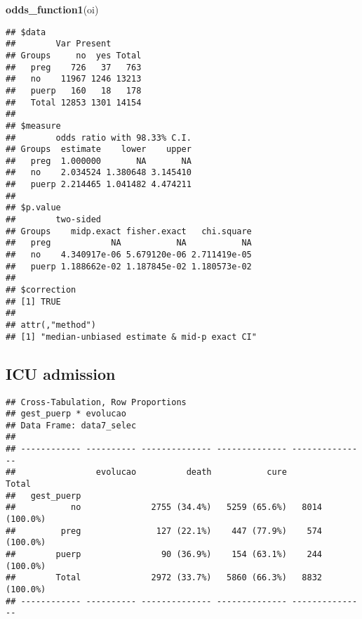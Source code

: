 \documentclass[
]{article}
\newenvironment{Shaded}{\begin{snugshade}}{\end{snugshade}}
\newcommand{\DataTypeTok}[1]{\textcolor[rgb]{0.13,0.29,0.53}{#1}}
\newcommand{\KeywordTok}[1]{\textcolor[rgb]{0.13,0.29,0.53}{\textbf{#1}}}
\newcommand{\NormalTok}[1]{#1}
\newcommand{\OperatorTok}[1]{\textcolor[rgb]{0.81,0.36,0.00}{\textbf{#1}}}
\newcommand{\OtherTok}[1]{\textcolor[rgb]{0.56,0.35,0.01}{#1}}
\newcommand{\StringTok}[1]{\textcolor[rgb]{0.31,0.60,0.02}{#1}}
\begin{document}
\begin{Shaded}
\begin{Highlighting}[]
\KeywordTok{odds_function1}\NormalTok{(oi)}
\end{Highlighting}
\end{Shaded}

\begin{verbatim}
## $data
##        Var Present
## Groups     no  yes Total
##   preg    726   37   763
##   no    11967 1246 13213
##   puerp   160   18   178
##   Total 12853 1301 14154
## 
## $measure
##        odds ratio with 98.33% C.I.
## Groups  estimate    lower    upper
##   preg  1.000000       NA       NA
##   no    2.034524 1.380648 3.145410
##   puerp 2.214465 1.041482 4.474211
## 
## $p.value
##        two-sided
## Groups    midp.exact fisher.exact   chi.square
##   preg            NA           NA           NA
##   no    4.340917e-06 5.679120e-06 2.711419e-05
##   puerp 1.188662e-02 1.187845e-02 1.180573e-02
## 
## $correction
## [1] TRUE
## 
## attr(,"method")
## [1] "median-unbiased estimate & mid-p exact CI"
\end{verbatim}

\hypertarget{icu-admission}{%
\subsection{ICU admission}\label{icu-admission}}

\begin{Shaded}
\end{Shaded}

\begin{Shaded}
\end{Shaded}

\begin{verbatim}
## Cross-Tabulation, Row Proportions  
## gest_puerp * evolucao  
## Data Frame: data7_selec  
## 
## ------------ ---------- -------------- -------------- ---------------
##                evolucao          death           cure           Total
##   gest_puerp                                                         
##           no              2755 (34.4%)   5259 (65.6%)   8014 (100.0%)
##         preg               127 (22.1%)    447 (77.9%)    574 (100.0%)
##        puerp                90 (36.9%)    154 (63.1%)    244 (100.0%)
##        Total              2972 (33.7%)   5860 (66.3%)   8832 (100.0%)
## ------------ ---------- -------------- -------------- ---------------
\end{verbatim}
\end{document}
